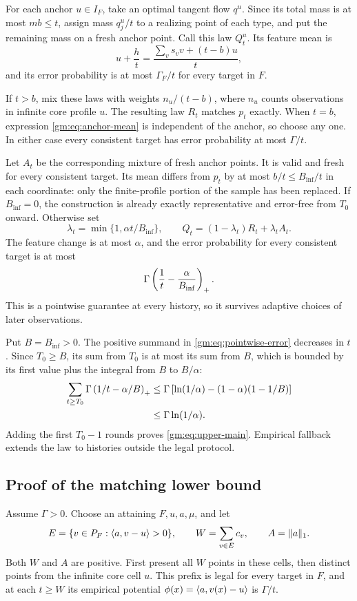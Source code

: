 For each anchor $u\in I_F$, take an optimal tangent flow $q^u$. Since its total mass is at most $mb\le t$, assign mass $q_j^u/t$ to a realizing point of each type, and put the remaining mass on a fresh anchor point. Call this law $Q_t^u$. Its feature mean is
\begin{equation}\label{gm:eq:anchor-mean}
u+\frac ht=
\frac{\sum_vs_vv+(t-b)u}{t},
\end{equation}
and its error probability is at most $\Gamma_F/t$ for every target in $F$.

If $t>b$, mix these laws with weights $n_u/(t-b)$, where $n_u$ counts observations in infinite core profile $u$. The resulting law $R_t$ matches $p_t$ exactly. When $t=b$, expression \eqref{gm:eq:anchor-mean} is independent of the anchor, so choose any one. In either case every consistent target has error probability at most $\Gamma/t$.

Let $A_t$ be the corresponding mixture of fresh anchor points. It is valid and fresh for every consistent target. Its mean differs from $p_t$ by at most $b/t\le B_{\mathrm{inf}}/t$ in each coordinate: only the finite-profile portion of the sample has been replaced. If $B_{\mathrm{inf}}=0$, the construction is already exactly representative and error-free from $T_0$ onward. Otherwise set
\[
\lambda_t=\min\{1,\alpha t/B_{\mathrm{inf}}\},\qquad
Q_t=(1-\lambda_t)R_t+\lambda_tA_t.
\]
The feature change is at most $\alpha$, and the error probability for every consistent target is at most
\begin{equation}\label{gm:eq:pointwise-error}
\Gamma\left(\frac1t-\frac\alpha{B_{\mathrm{inf}}}\right)_+.
\end{equation}
This is a pointwise guarantee at every history, so it survives adaptive choices of later observations.

Put $B=B_{\mathrm{inf}}>0$. The positive summand in \eqref{gm:eq:pointwise-error} decreases in $t$. Since $T_0\ge B$, its sum from $T_0$ is at most its sum from $B$, which is bounded by its first value plus the integral from $B$ to $B/\alpha$:
\begin{align*}
\sum_{t\ge T_0}\Gamma\left(1/t-\alpha/B\right)_+
&\le\Gamma\left[\ln(1/\alpha)-(1-\alpha)(1-1/B)\right]\\
&\le\Gamma\ln(1/\alpha).
\end{align*}
Adding the first $T_0-1$ rounds proves \eqref{gm:eq:upper-main}. Empirical fallback extends the law to histories outside the legal protocol.

\subsection{Proof of the matching lower bound}
Assume $\Gamma>0$. Choose an attaining $F,u,a,\mu$, and let
\[
E=\{v\in P_F:\langle a,v-u\rangle>0\},\qquad
W=\sum_{v\in E}c_v,\qquad A=\|a\|_1.
\]
Both $W$ and $A$ are positive. First present all $W$ points in these cells, then distinct points from the infinite core cell $u$. This prefix is legal for every target in $F$, and at each $t\ge W$ its empirical potential $\phi(x)=\langle a,v(x)-u\rangle$ is $\Gamma/t$.

